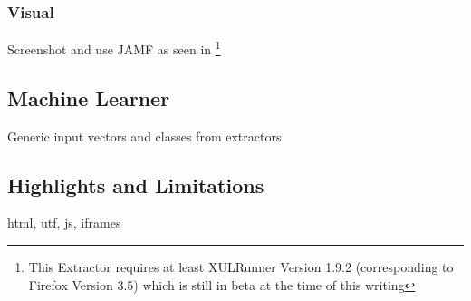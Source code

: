 \subsubsection{Visual}

Screenshot and use JAMF as seen in \cite{Steger08}
\footnote{This Extractor requires at least XULRunner Version 1.9.2 (corresponding to Firefox Version 3.5) which is still in beta at the time of this writing}

\subsection{Machine Learner}

Generic input vectors and classes from extractors

\subsection{\label{sec:limitations}Highlights and Limitations}

html, utf, js, iframes
